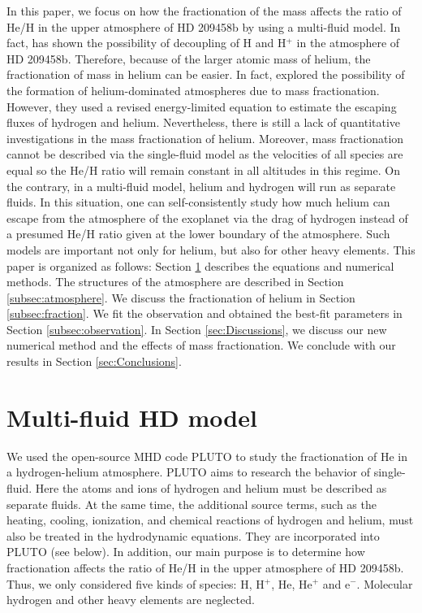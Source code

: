 \documentclass[journal, onecolumn]{aastex631}
\begin{document}
\begin{CJK*}{UTF8}{gbsn}
In this paper, we focus on how the fractionation of the mass affects the ratio of He/H in the upper atmosphere of HD 209458b by using a multi-fluid model. In fact, \cite{Guo2011} has shown the possibility of decoupling of H and H$^+$ in the atmosphere of HD 209458b. Therefore, because of the larger atomic mass of helium, the fractionation of mass in helium can be easier. In fact, \cite{Hu2015} explored the possibility of the formation of helium-dominated atmospheres due to  mass fractionation. However, they used a revised energy-limited equation to estimate the escaping fluxes of hydrogen and helium. Nevertheless, there is still a lack of quantitative investigations in the mass fractionation of helium.
Moreover, mass fractionation cannot be described via the single-fluid model as the velocities of all species are equal so the He/H ratio will remain constant in all altitudes in this regime. On the contrary, in a multi-fluid model, helium and hydrogen will run as separate fluids. In this situation, one can self-consistently study how much helium can escape from the atmosphere of the exoplanet via the drag of hydrogen instead of a presumed He/H ratio given at the lower boundary of the atmosphere. Such models are important not only for helium, but also for other heavy elements. This paper is organized as follows: Section \ref{sec:model_description} describes the equations and numerical methods. The structures of the atmosphere are described in Section \ref{subsec:atmosphere}. We discuss the fractionation of helium in Section \ref{subsec:fraction}. We fit the observation and obtained the best-fit parameters in Section \ref{subsec:observation}. In Section \ref{sec:Discussions}, we discuss our new numerical method and the effects of mass fractionation. We conclude with our results in Section \ref{sec:Conclusions}.



\section{Multi-fluid HD model} \label{sec:model_description}
We used the open-source MHD code PLUTO \citep{Mignone2007} to study the fractionation of He in a hydrogen-helium atmosphere. PLUTO aims to research the behavior of single-fluid. Here the atoms and ions of hydrogen and helium must be described as separate fluids. At the same time, the additional source terms, such as the heating, cooling, ionization, and chemical reactions of hydrogen and helium, must also be treated in the hydrodynamic equations. They are incorporated into PLUTO (see below). In addition, our main purpose is to determine how  fractionation affects the ratio of He/H in the upper atmosphere of HD 209458b. Thus, we only considered five kinds of species: H, H$^{+}$, He, He$^{+}$ and e$^-$. Molecular hydrogen and other heavy elements are neglected.




\end{CJK*}
\end{document}
